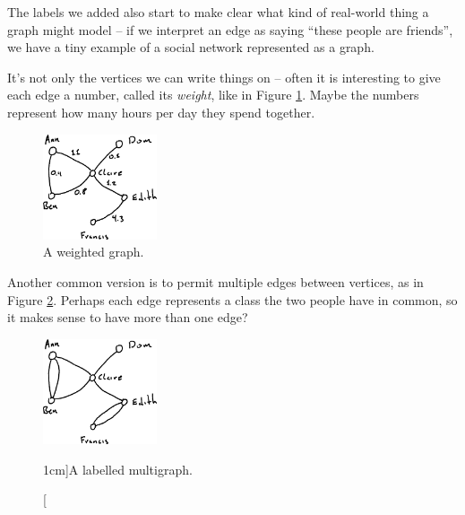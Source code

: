 \documentclass[nobib]{tufte-handout}
\begin{document}
The labels we added also start to make clear what kind of real-world thing a graph might model -- if we interpret an edge as saying ``these people are friends'', we have a tiny example of a social network represented as a graph.

It's not only the vertices we can write things on -- often it is interesting to give each edge a number, called its \emph{weight}, like in Figure \ref{fig:weighted_graph}. Maybe the numbers represent how many hours per day they spend together.

\begin{figure}
  \centering
  \includegraphics[width=0.3\textwidth]{graphics/L1_exc/weighted_graph.png}
  \caption{A weighted graph.}
  \label{fig:weighted_graph}
\end{figure}

Another common version is to permit multiple edges between vertices, as in Figure \ref{fig:labelled_multigraph}. Perhaps each edge represents a class the two people have in common, so it makes sense to have more than one edge?

\begin{figure}
  \centering
  \includegraphics[width=0.3\textwidth]{graphics/L1_exc/multigraph.png}
  \caption[][1cm]{A labelled multigraph.}
  \label{fig:labelled_multigraph}
\end{figure}
\end{document}
